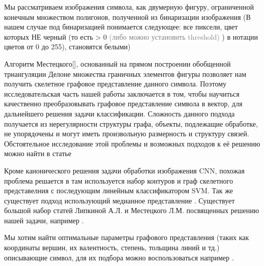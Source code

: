 \documentclass[12pt, twoside]{article}
\begin{document}
Мы рассматриваем изображения символа, как двумерную фигуру, ограниченной конечным множеством полигонов, полученной из бинаризации изображения (В нашем случае под бинаризацией понимается следующее: все пиксели, цвет которых НЕ черный (то есть > 0 \textcolor{gray}{(либо можно установить threshold)} ) в нотации цветов от 0 до 255), становятся белыми)

Алгоритм Местецкого[], основанный на прямом построении обобщенной триангуляции Делоне множества граничных элементов фигуры позволяет нам получить скелетное графовое представление данного символа. Поэтому исследовательская часть нашей работы заключается в том, чтобы научиться качественно преобразовывать графовое представление символа в вектор, для дальнейшего решения задачи классификации. Сложность данного подхода получается из нерегулярности структуры графа, объекты, подлежащие обработке, не упорядочены и могут иметь произвольную размерность и структуру связей. Обстоятельное исследование этой проблемы и возможных подходов к её решению можно найти в статье \cite{going_beyond_Euclidean_data} %

Кроме канонического решения задачи обработки изображения CNN, похожая проблема решается в \cite{solution_by_SVM_classifier} там используется набор контуров и граф скелетного представелния с последующим линейным классификатором SVM. Так же существует подход использующий медианное представление \cite{solution_by_Medial_Representation_GCNN}. Существует большой набор статей Липкиной А.Л. и Местецкого Л.М. посвященных решению нашей задачи, например \cite{Lipkina_Mestetskiy_1} \cite{Lipkina_Mestetskiy_2}.

Мы хотим найти оптимальные параметры графового представления (таких как координаты вершин, их валентность, степень, тольщина линий и тд.) описывающие символ, для их подбора можно воспользоваться например \cite{Structural_functional_analisys}.





\end{document}
